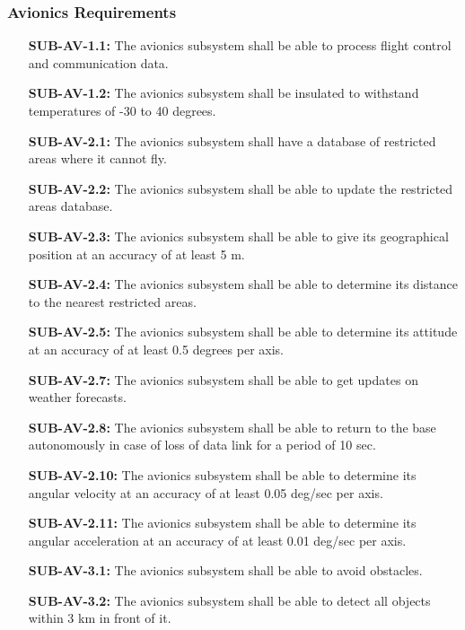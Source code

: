 \subsubsection{Avionics Requirements}
\begin{enumerate}[leftmargin =3.5cm, align=parleft, labelwidth=8em]
    \item[\textbf{SUB-AV-1.1:}] The avionics subsystem shall be able to process flight control and communication data.
    \item[\textbf{SUB-AV-1.2:}] The avionics subsystem shall be insulated to withstand temperatures of -30 to 40 degrees.
    \item[\textbf{SUB-AV-2.1:}] The avionics subsystem shall have a database of restricted areas where it cannot fly.
    \item[\textbf{SUB-AV-2.2:}] The avionics subsystem shall be able to update the restricted areas database.
    \item[\textbf{SUB-AV-2.3:}] The avionics subsystem shall be able to give its geographical position at an accuracy of at least 5 m.
    \item[\textbf{SUB-AV-2.4:}] The avionics subsystem shall be able to determine its distance to the nearest restricted areas.
    \item[\textbf{SUB-AV-2.5:}] The avionics subsystem shall be able to determine its attitude at an accuracy of at least 0.5 degrees per axis.
    \item[\textbf{SUB-AV-2.7:}] The avionics subsystem shall be able to get updates on weather forecasts.
    \item[\textbf{SUB-AV-2.8:}] The avionics subsystem shall be able to return to the base autonomously in case of loss of data link for a period of 10 sec.
    \item[\textbf{SUB-AV-2.10:}] The avionics subsystem shall be able to determine its angular velocity at an accuracy of at least 0.05 deg/sec per axis.
    \item[\textbf{SUB-AV-2.11:}] The avionics subsystem shall be able to determine its angular acceleration at an accuracy of at least 0.01 deg/sec per axis.
    \item[\textbf{SUB-AV-3.1:}] The avionics subsystem shall be able to avoid obstacles.
    \item[\textbf{SUB-AV-3.2:}] The avionics subsystem shall be able to detect all objects within 3 km in front of it.

\end{enumerate}
